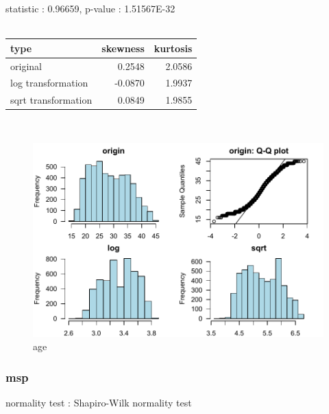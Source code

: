 \documentclass{book}\usepackage[]{graphicx}\usepackage[]{color}
\begin{document}
\noindent statistic : 0.96659,  p-value : 1.51567E-32\\
\\%
\begin{tabular}{lrr}
  \toprule
type & skewness & kurtosis \\ 
  \midrule
original & 0.2548 & 2.0586 \\ 
  log transformation & -0.0870 & 1.9937 \\ 
  sqrt transformation & 0.0849 & 1.9855 \\ 
   \bottomrule
\end{tabular}
\\
\begin{figure}[!ht]
\centering
\includegraphics[width=1.0\textwidth]{figure/norm4.pdf}
\caption{age}
\end{figure}
\clearpage
\subsubsection{ msp }

normality test : Shapiro-Wilk normality test
\end{document}
